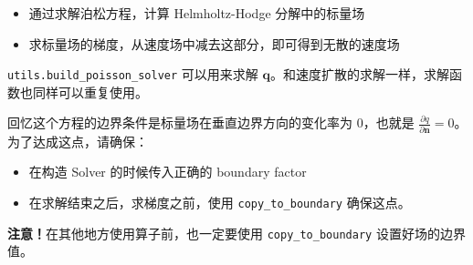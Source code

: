 \documentclass{ctexart}
\begin{document}
\begin{itemize}
  \item 通过求解泊松方程，计算 Helmholtz-Hodge 分解中的标量场
  \item 求标量场的梯度，从速度场中减去这部分，即可得到无散的速度场
\end{itemize}

\texttt{utils.build\_poisson\_solver} 可以用来求解 $\mathbf{q}$。和速度扩散的求解一样，求解函数也同样可以重复使用。

回忆这个方程的边界条件是标量场在垂直边界方向的变化率为 0，也就是 $\frac{\partial q}{\partial \mathbf{n}} = 0$。为了达成这点，请确保：

\begin{itemize}
  \item 在构造 Solver 的时候传入正确的 boundary factor
  \item 在求解结束之后，求梯度之前，使用 \texttt{copy\_to\_boundary} 确保这点。
\end{itemize}

\textbf{注意！}在其他地方使用算子前，也一定要使用 \texttt{copy\_to\_boundary} 设置好场的边界值。
\end{document}
